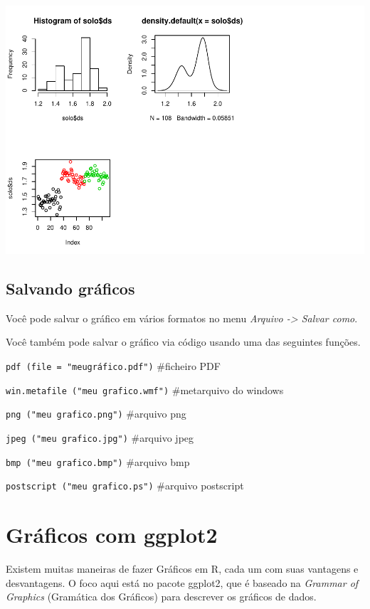 \documentclass[]{book}
\begin{document}
\includegraphics{TudodoR_files/figure-latex/unnamed-chunk-181-2.pdf}

\hypertarget{salvando-graficos}{%
\section{Salvando gráficos}\label{salvando-graficos}}

Você pode salvar o gráfico em vários formatos no menu
\emph{Arquivo -\textgreater{} Salvar como}.

Você também pode salvar o gráfico via código usando uma das seguintes funções.

\texttt{pdf\ (file\ =\ "meugráfico.pdf")} \#ficheiro PDF

\texttt{win.metafile\ ("meu\ grafico.wmf")} \#metarquivo do windows

\texttt{png\ ("meu\ grafico.png")} \#arquivo png

\texttt{jpeg\ ("meu\ grafico.jpg")} \#arquivo jpeg

\texttt{bmp\ ("meu\ grafico.bmp")} \#arquivo bmp

\texttt{postscript\ ("meu\ grafico.ps")} \#arquivo postscript

\hypertarget{graficos-com-ggplot2}{%
\chapter{Gráficos com ggplot2}\label{graficos-com-ggplot2}}

Existem muitas maneiras de fazer Gráficos em R, cada um com suas vantagens e desvantagens. O foco aqui está no pacote ggplot2, que é baseado na \emph{Grammar of Graphics} (Gramática dos Gráficos) para descrever os gráficos de dados.
\end{document}
